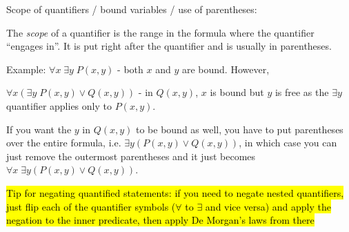\documentclass{article}
\begin{document}
\begin{description}
	\item \qquad Scope of quantifiers / bound variables / use of parentheses: 
	\begin{description}
		\item \qquad The \emph{scope} of a quantifier is the range in the formula where the quantifier ``engages in''. It is put right after the quantifier and is usually in parentheses.
		\item \qquad Example: $\forall x\; \exists y\; P(x,y)$ - both $x$ and $y$ are bound. However,
		\item \qquad $\forall x(\exists y\; P(x,y) \lor Q(x,y))$ - in $Q(x,y)$, $x$ is bound but $y$ is free as the $\exists y$ quantifier applies only to $P(x, y)$. 
		\item \qquad If you want the $y$ in $Q(x,y)$ to be bound as well, you have to put parentheses over the entire formula, i.e. $\exists y(P(x,y) \lor Q(x, y))$, in which case you can just remove the outermost parentheses and it just becomes $\forall x\; \exists y(P(x,y) \lor Q(x,y))$.
	\end{description}
	\item \hl{Tip for negating quantified statements: if you need to negate nested quantifiers, just flip each of the quantifier symbols ($\forall$ to $\exists$ and vice versa) and apply the negation to the inner predicate, then apply De Morgan's laws from there}


\end{description}
\end{document}
